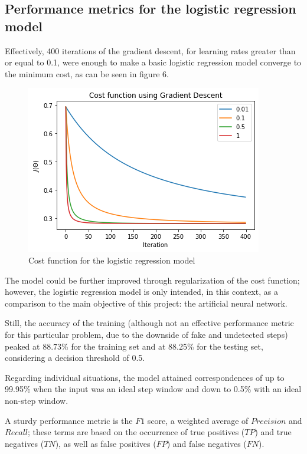\documentclass[conference]{IEEEtran}
\begin{document}
\subsection{Performance metrics for the logistic regression model}
Effectively, 400 iterations of the gradient descent, for learning rates greater than or equal to 0.1, were enough to make a basic logistic regression model converge to the minimum cost, as can be seen in figure 6. 
\begin{figure}[H]
\centering
\includegraphics[scale=0.6]{LOGREG.png}
\caption{Cost function for the logistic regression model}
\label{fig:logregcost}
\end{figure}

The model could be further improved through regularization of the cost function; however, the logistic regression model is only intended, in this context, as a comparison to the main objective of this project: the artificial neural network.

\par Still, the accuracy of the training (although not an effective performance metric for this particular problem, due to the downside of fake and undetected steps) peaked at 88.73\% for the training set and at 88.25\% for the testing set, considering a decision threshold of 0.5. \par Regarding individual situations, the model attained correspondences of up to 99.95\% when the input was an ideal step window and down to 0.5\% with an ideal non-step window. \par

A sturdy performance metric is the $F1$ score, a weighted average of $Precision$ and $Recall$; these terms are based on the occurrence of true positives ($TP$) and true negatives ($TN$), as well as false positives ($FP$) and false negatives ($FN$). \par
\end{document}
